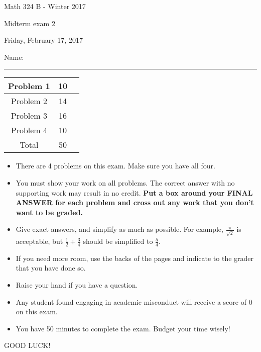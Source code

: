 \documentclass[12 pt]{report}
\begin{document}
\noindent \vfill \noindent \large

\centerline{Math 324 B  - Winter 2017}

\centerline{Midterm exam 2}

\centerline{Friday, February 17, 2017}

\normalsize

\vfill
\medskip
Name: \rule{10cm}{1pt}

\bigskip

\vfill
\begin{center}
{\large
\begin{tabular}{||c|c|r||}
\hline Problem 1 & 10 & \hspace{10mm} \hfill \\
\hline Problem 2 & 14 & \hspace{10mm} \hfill \\
\hline Problem 3 & 16 & \hspace{10mm} \hfill \\
\hline Problem 4 & 10  & \hspace{10mm} \hfill \\
\hline Total & 50 & \hspace{10mm} \hfill \\
\hline
\end{tabular}
}
\end{center}
\vfill
\begin{itemize}
\item There are 4 problems on this exam. Make sure you have all four.
\item You must show your work on all problems.  The correct answer
with no supporting work may result in no credit. \textbf{Put a box
around your FINAL ANSWER for each problem and cross out any work
that you don't want to be graded.} 
\item Give exact answers, and simplify as much as possible. 
For example, $\frac{\pi}{\sqrt{2}}$ is acceptable, but $\frac{1}{2} + \frac{3}{4}$
should be simplified to $\frac{5}{4}$.   

\item If you need more room, use the backs
of the pages and indicate to the grader that you have done so.
\item Raise your hand if you have a question.
\item Any student found engaging in academic misconduct will receive
a score of 0 on this exam.
\item You have 50 minutes to complete the exam.  Budget your time wisely! \\
\end{itemize}
\vfill
\begin{center}GOOD LUCK!\end{center}
\end{document}
